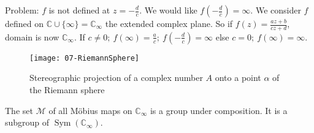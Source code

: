 Problem: $f$ is not defined at $z = - \frac{d}{c}$.
We would like $f(-\frac{d}{c}) = \infty$.
We consider $f$ defined on $\mathbb{C} \cup \{ \infty \} = \mathbb{C}_\infty$ the extended complex plane.
So if $f(z) = \frac{az + b}{cz + d}$, domain is now $\mathbb{C}_\infty$.
If $c \neq 0;\ f(\infty) = \frac{a}{c};\ f(-\frac{d}{c}) = \infty$ else $c = 0;\ f(\infty) = \infty$.

\begin{figure}
    \centering
    \texttt{[image: 07-RiemannSphere]}
    \caption{Stereographic projection of a complex number $A$ onto a point $\alpha$ of the Riemann sphere}
\end{figure} 

\begin{theorem}\label{thm:14}
    The set $\mathcal{M}$ of all M\"obius maps on $\mathbb{C}_\infty$ is a group under composition.
    It is a subgroup of $\operatorname{Sym}(\mathbb{C}_\infty)$.
\end{theorem} 

